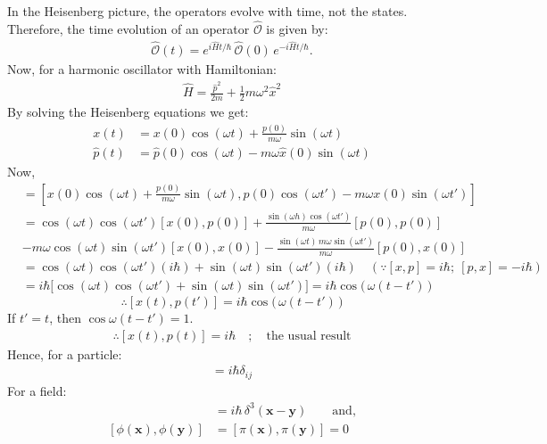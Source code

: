 \documentclass[14pt]{article} %
\begin{document}
{In the Heisenberg picture, the operators evolve with time, not the states. Therefore, the time evolution of an operator $\hat{\mathcal{O}}$ is given by:
\begin{align*}
\hat{\mathcal{O}}(t) = e^{i \hat{H} t / \hbar} \, \hat{\mathcal{O}}(0) \, e^{-i \hat{H} t / \hbar}.
\end{align*}
Now, for a harmonic oscillator with Hamiltonian:
\begin{align*}
\hat{H} = \frac{\hat{p}^2}{2m} + \frac{1}{2} m \omega^2 \hat{x}^2
\end{align*}
By solving the Heisenberg equations we get:
\begin{align*}
x(t) &= x(0) \cos(\omega t) + \frac{p(0)}{m \omega} \sin(\omega t) \\
\hat{p}(t) &= \hat{p}(0) \cos(\omega t) - m \omega \hat{x}(0) \sin(\omega t)
\end{align*}
Now,
\begin{align*}
[ x(t), p(t') ] &= \left[ x(0) \cos(\omega t) + \frac{p(0)}{m \omega} \sin(\omega t),
p(0) \cos(\omega t') - m \omega x(0) \sin(\omega t') \right] 
\\
&= \cos(\omega t) \cos(\omega t') [x(0), p(0)]
+ \frac{\sin(\omega h) \cos(\omega t')}{m \omega} [p(0), p(0)] 
\\
&- m \omega \cos(\omega t) \sin(\omega t') [x(0), x(0)]
- \frac{\sin(\omega t) \, m \omega \sin(\omega t')}{m \omega} [p(0), x(0)]
\\
&= \cos(\omega t) \cos(\omega t') (i \hbar) + \sin(\omega t) \sin(\omega t') (i \hbar) \quad \left(\because [x, p] = i \hbar;~ [p, x] = -i \hbar \right)
\\
&= i \hbar \big[ \cos(\omega t) \cos(\omega t') + \sin(\omega t) \sin(\omega t') \big] = i \hbar \cos\big( \,\omega(t - t')\, \big)
\end{align*}
\[
\therefore [ x(t), p(t') ] = i \hbar \cos\big( \,\omega(t - t')\, \big)
\]
If $t' = t$, then $\cos\omega(t-t') = 1$.
\begin{align*}
\therefore [x(t), p(t)] = i \hbar \quad;\quad \text{the usual result}
\end{align*}
Hence, for a particle:
\begin{align*}
[x_i(t), p_j(t)] = i \hbar \delta_{ij}
\end{align*}
For a field:
\begin{align*}
[\phi(\mathbf{x}),\pi(\mathbf{y})] &= i \hbar \, \delta^3(\mathbf{x} - \mathbf{y}) \qquad \text{and,}
\\
[\phi(\mathbf{x}), \phi(\mathbf{y})] &= [\pi(\mathbf{x}), \pi(\mathbf{y})] = 0

\end{align*}}
\end{document}
